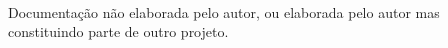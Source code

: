 \paragraph{}Documentação não elaborada pelo autor, ou elaborada pelo autor mas constituindo parte de outro projeto.